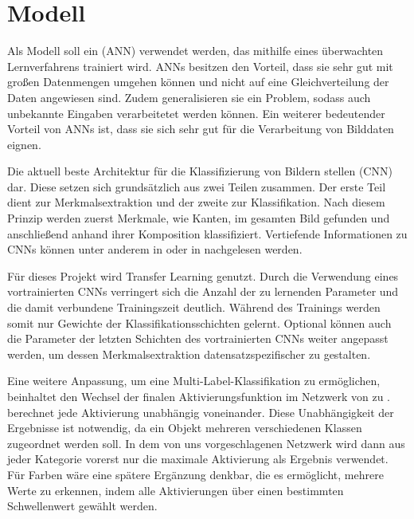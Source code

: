 \section{Modell} \label{sec:model}

Als Modell soll ein  (ANN) verwendet werden, das mithilfe eines überwachten Lernverfahrens trainiert wird. ANNs besitzen den Vorteil, dass sie sehr gut mit großen Datenmengen umgehen können und nicht auf eine Gleichverteilung der Daten angewiesen sind. Zudem generalisieren sie ein Problem, sodass auch unbekannte Eingaben verarbeitetet werden können. Ein weiterer bedeutender Vorteil von ANNs ist, dass sie sich sehr gut für die Verarbeitung von Bilddaten eignen. \cite{Mahanta2020}

Die aktuell beste Architektur für die Klassifizierung von Bildern stellen  (CNN) dar. Diese setzen sich grundsätzlich aus zwei Teilen zusammen. Der erste Teil dient zur Merkmalsextraktion und der zweite zur Klassifikation. Nach diesem Prinzip werden zuerst Merkmale, wie Kanten, im gesamten Bild gefunden und anschließend anhand ihrer Komposition klassifiziert. Vertiefende Informationen zu CNNs können unter anderem in \cite{Goodfellow2016} oder in \cite{CS2020} nachgelesen werden.

Für dieses Projekt wird Transfer Learning genutzt. Durch die Verwendung eines vortrainierten CNNs verringert sich die Anzahl der zu lernenden Parameter und die damit verbundene Trainingszeit deutlich. Während des Trainings werden somit nur Gewichte der Klassifikationsschichten gelernt. Optional können auch die Parameter der letzten Schichten des vortrainierten CNNs weiter angepasst werden, um dessen Merkmalsextraktion datensatzspezifischer zu gestalten.

Eine weitere Anpassung, um eine Multi-Label-Klassifikation zu ermöglichen, beinhaltet den Wechsel der finalen Aktivierungsfunktion im Netzwerk von  zu .  berechnet jede Aktivierung unabhängig voneinander. Diese Unabhängigkeit der Ergebnisse ist notwendig, da ein Objekt mehreren verschiedenen Klassen zugeordnet werden soll. In dem von uns vorgeschlagenen Netzwerk wird dann aus jeder Kategorie vorerst nur die maximale Aktivierung als Ergebnis verwendet. Für Farben wäre eine spätere Ergänzung denkbar, die es ermöglicht, mehrere Werte zu erkennen, indem alle Aktivierungen über einen bestimmten Schwellenwert gewählt werden. 

